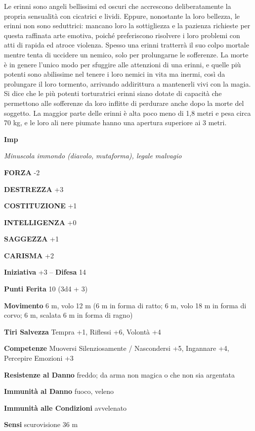 \begin{multicols}{2}
	Le erinni sono angeli bellissimi ed oscuri che accrescono deliberatamente la propria sensualità con cicatrici e lividi. Eppure, nonostante la loro bellezza, le erinni non sono seduttrici: mancano loro la sottigliezza e la pazienza richieste per questa raffinata arte emotiva, poiché preferiscono risolvere i loro problemi con atti di rapida ed atroce violenza. Spesso una erinni tratterrà il suo colpo mortale mentre tenta di uccidere un nemico, solo per prolungarne le sofferenze. La morte è in genere l'unico modo per sfuggire alle attenzioni di una erinni, e quelle più potenti sono abilissime nel tenere i loro nemici in vita ma inermi, così da prolungare il loro tormento, arrivando addirittura a mantenerli vivi con la magia. Si dice che le più potenti torturatrici erinni siano dotate di capacità che permettono alle sofferenze da loro inflitte di perdurare anche dopo la morte del soggetto.  La maggior parte delle erinni è alta poco meno di 1,8 metri e pesa circa 70 kg, e le loro ali nere piumate hanno una apertura superiore ai 3 metri.


	\medskip{}\textbf{Imp}

	\textit{Minuscola immondo (diavolo, mutaforma), legale malvagio}

	\textbf{FORZA} -2

	\textbf{DESTREZZA} +3

	\textbf{COSTITUZIONE} +1

	\textbf{INTELLIGENZA} +0

	\textbf{SAGGEZZA} +1

	\textbf{CARISMA} +2

	\textbf{Iniziativa} +3 -- \textbf{Difesa} 14

	\textbf{Punti Ferita} 10 (3d4 + 3)

	\textbf{Movimento} 6 m, volo 12 m (6 m in forma di ratto; 6 m, volo 18 m in forma di corvo; 6 m, scalata 6 m in forma di ragno)

	\textbf{Tiri Salvezza} Tempra +1, Riflessi +6, Volontà +4

	\textbf{Competenze} Muoversi Silenziosamente / Nascondersi +5, Ingannare +4, Percepire Emozioni +3

	\textbf{Resistenze al Danno} freddo; da arma non magica o che non sia argentata

	\textbf{Immunità al Danno} fuoco, veleno

	\textbf{Immunità alle Condizioni} avvelenato

	\textbf{Sensi} scurovisione 36 m


\end{multicols}
